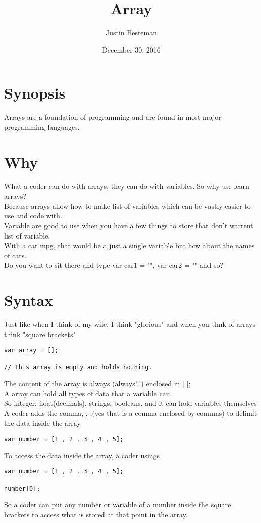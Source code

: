 \documentclass[12pt, letterpaper]{article}
\title{Array}
\author{Justin Besteman}
\date{December 30, 2016}
\begin{document}
\maketitle


\section*{Synopsis}

Arrays are a foundation of programming and are found in most major programming languages.

\section*{Why}

What a coder can do with arrays, they can do with variables. So why use learn arrays? \\
Because arrays allow how to make list of variables which can be vastly easier to use and code with.\\
Variable are good to use when you have a few things to store that don't warrent list of variable. \\
With a car mpg, that would be a just a single variable but how about the names of cars. \\
Do you want to sit there and type var car1 = "", var car2 = "" and so? \\


\section*{Syntax}

Just like when I think of my wife, I think "glorious" and when you thnk of arrays think "square brackets"
\begin{lstlisting}
var array = [];

// This array is empty and holds nothing. 
\end{lstlisting}
The content of the array is always (always!!!) enclosed in [ ];\\
A array can hold all types of data that a variable can. \\
So integer, float(decimals), strings, booleans, and it can hold variables themselves\\
A coder adds the comma, , ,(yes that is a comma enclosed by commas) to delimit the data inside the array\\
\begin{lstlisting}
var number = [1 , 2 , 3 , 4 , 5];
\end{lstlisting}
To access the data inside the array, a coder usings 
\begin{lstlisting}
var number = [1 , 2 , 3 , 4 , 5];

number[0];
\end{lstlisting}
So a coder can put any number or variable of a number inside the square brackets to access what is stored at that point in the array. 
\end{document}

